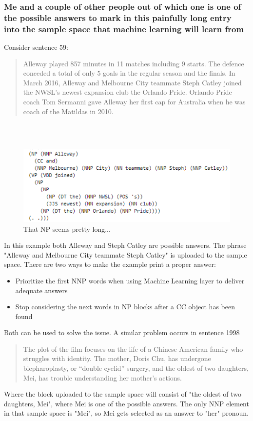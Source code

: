 \documentclass{article}
\begin{document}
\subsubsection{Me and a couple of other people out of which one is one of the possible answers to mark in this painfully long entry into the sample space that machine learning will learn from}
Consider sentence 59:
\begin{quote}
    Alleway played 857 minutes in 11 matches including 9 starts. The defence conceded a total of only 5 goals in the regular season and the finals. In March 2016, Alleway and Melbourne City teammate Steph Catley joined the NWSL's newest expansion club the Orlando Pride. Orlando Pride coach Tom Sermanni gave Alleway her first cap for Australia when he was coach of the Matildas in 2010.
\end{quote} \\ \\
\begin{figure}[h!]
    \centering
\includegraphics[]{Example9.png}
    \caption{That NP seems pretty long...}
\end{figure}
In this example both Alleway and Steph Catley are possible answers. The phrase "Alleway and Melbourne City teammate Steph Catley" is uploaded to the sample space. There are two ways to make the example print a proper answer:
\begin{itemize}
    \item Prioritize the first NNP words when using Machine Learning layer to deliver adequate answers
    \item Stop considering the next words in NP blocks after a CC object has been found
\end{itemize}
Both can be used to solve the issue. A similar problem occurs in sentence 1998
\begin{quote}
    The plot of the film focuses on the life of a Chinese American family who struggles with identity. The mother, Doris Chu, has undergone blepharoplasty, or ``double eyelid'' surgery, and the oldest of two daughters, Mei, has trouble understanding her mother's actions.
\end{quote}
Where the block uploaded to the sample space will consist of "the oldest of two daughters, Mei", where Mei is one of the possible answers. The only NNP element in that sample space is "Mei", so Mei gets selected as an answer to "her" pronoun.
\end{document}
